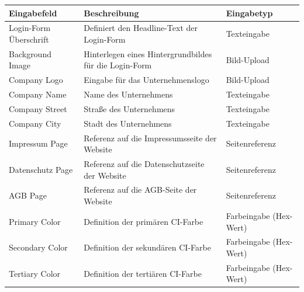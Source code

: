\documentclass[
	ngerman,
	BCOR=8mm,
	headings=normal,
	parskip=half,
	headsepline,
	automark,
	listof=totoc,
	bibliography=totoc,
]{scrreprt}
\begin{document}
%

\cleardoublepage
{}


\cleardoublepage
{}
\tableofcontents
\listoftables
\listoffigures
\printglossary
\printglossary[type=\acronymtype, title={Abkürzungsverzeichnis}]
\printglossary[type=symbols, title={Symbolverzeichnis}]
%
\cleardoublepage
{}





%
\printbibliography[prenote=mynote]
%
\appendix
{}
\begin{table}[h]
    \centering
    \renewcommand{\arraystretch}{1.3}
    \begin{tabular}{|p{3cm}|p{6cm}|p{5cm}|}
        \hline
        \textbf{Eingabefeld} & \textbf{Beschreibung} & \textbf{Eingabetyp} \\
        \hline
        Login-Form Überschrift & Definiert den Headline-Text der Login-Form & Texteingabe \\
        \hline
        Background Image & Hinterlegen eines Hintergrundbildes für die Login-Form & Bild-Upload \\
        \hline
        Company Logo & Eingabe für das Unternehmenslogo & Bild-Upload \\
        \hline
        Company Name & Name des Unternehmens & Texteingabe \\
        \hline
        Company Street & Straße des Unternehmens & Texteingabe \\
        \hline
        Company City & Stadt des Unternehmens & Texteingabe \\
        \hline
        Impressum Page & Referenz auf die Impressumsseite der Website & Seitenreferenz \\
        \hline
        Datenschutz Page & Referenz auf die Datenschutzseite der Website & Seitenreferenz \\
        \hline
        AGB Page & Referenz auf die AGB-Seite der Website & Seitenreferenz \\
        \hline
        Primary Color & Definition der primären CI-Farbe & Farbeingabe (Hex-Wert) \\
        \hline
        Secondary Color & Definition der sekundären CI-Farbe & Farbeingabe (Hex-Wert) \\
        \hline
        Tertiary Color & Definition der tertiären CI-Farbe & Farbeingabe (Hex-Wert) \\

\end{tabular}
\end{table}
\end{document}
